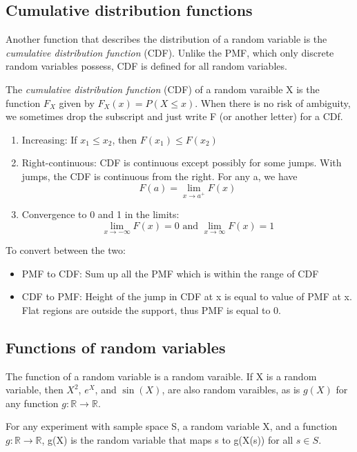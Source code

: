 \documentclass[12pt, letterpaper]{article}
\begin{document}
\subsection{Cumulative distribution functions}

Another function that describes the distribution of a random variable is the \textit{cumulative distribution function} (CDF). Unlike the PMF, which only discrete random variables possess, CDF is defined for all random variables.

The \textit{cumulative distribution function} (CDF) of a random varaible X is the function \(F_X\) given by \(F_X(x) = P(X \leq x)\). When there is no risk of ambiguity, we sometimes drop the subscript and just write F (or another letter) for a CDf.
\begin{enumerate}
    \item Increasing: If \(x_1 \leq x_2\), then \(F(x_1) \leq F(x_2)\)
    \item Right-continuous: CDF is continuous except possibly for some jumps. With jumps, the CDF is continuous from the right. For any a, we have  \[F(a) = \lim_{x \rightarrow a^+}F(x)\]
    \item Convergence to 0 and 1 in the limits: \[\lim_{x \rightarrow -\infty}F(x) = 0 \text{ and } \lim_{x \rightarrow \infty}F(x) = 1 \]
\end{enumerate}
To convert between the two:
\begin{itemize}
    \item PMF to CDF: Sum up all the PMF which is within the range of CDF
    \item CDF to PMF: Height of the jump in CDF at x is equal to value of PMF at x. Flat regions are outside the support, thus PMF is equal to 0.
\end{itemize}

\subsection{Functions of random variables}

The function of a random variable is a random varaible. If X is a random variable, then \(X^2\), \(e^X\), and \(\sin(X)\), are also random varaibles, as is \(g(X)\) for any function \(g : \mathbb{{R} \rightarrow \mathbb{R}}\).

For any experiment with sample space S, a random variable X, and a function \(g : \mathbb{R} \rightarrow \mathbb{R}\), g(X) is the random variable that maps s to g(X(s)) for all \(s \in S\).
\end{document}
